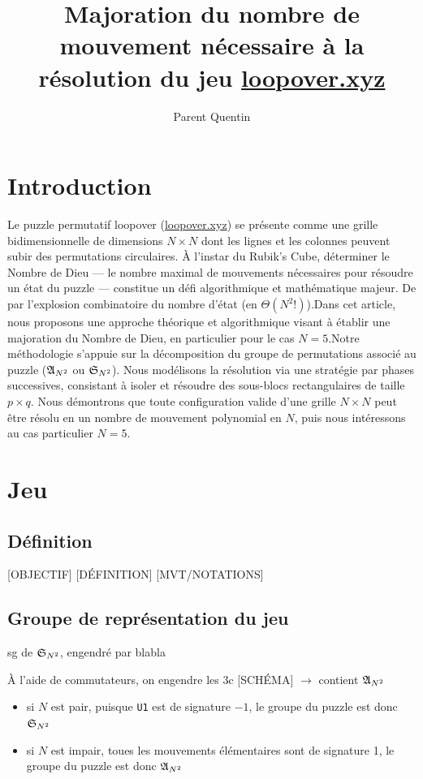 \documentclass[a4paper, 12pt]{article}
\title{Majoration du nombre de mouvement nécessaire à la résolution du jeu \url{loopover.xyz}}
\author{Parent Quentin}
\date{}
\begin{document}
	\maketitle
	
	\section*{Introduction}
	Le puzzle permutatif loopover (\url{loopover.xyz}) se présente comme une grille bidimensionnelle de dimensions $N \times N$ dont les lignes et les colonnes peuvent subir des permutations circulaires. À l'instar du Rubik's Cube, déterminer le Nombre de Dieu — le nombre maximal de mouvements nécessaires pour résoudre un état du puzzle — constitue un défi algorithmique et mathématique majeur. De par l'explosion combinatoire du nombre d'état (en $\Theta(N^2!)$).Dans cet article, nous proposons une approche théorique et algorithmique visant à établir une majoration du Nombre de Dieu, en particulier pour le cas $N=5$.Notre méthodologie s'appuie sur la décomposition du groupe de permutations associé au puzzle ($\mathfrak{A}_{N^2}$ ou $\mathfrak{S}_{N^2}$). Nous modélisons la résolution via une stratégie par phases successives, consistant à isoler et résoudre des sous-blocs rectangulaires de taille $p\times q$. Nous démontrons que toute configuration valide d'une grille $N\times N$ peut être résolu en un nombre de mouvement polynomial en $N$, puis nous intéressons au cas particulier $N=5$.
	
	\section{Jeu}
		\subsection{Définition}
			[OBJECTIF]
			[DÉFINITION]
			[MVT/NOTATIONS]
		\subsection{Groupe de représentation du jeu} \label{gr}
			sg de $\mathfrak{S}_{N^2}$, engendré par blabla
			
			À l'aide de commutateurs, on engendre les 3c [SCHÉMA] $\rightarrow$ contient $\mathfrak{A}_{N^2}$
			
			\begin{itemize}
				\item si $N$ est pair, puisque \texttt{U1} est de signature $-1$, le groupe du puzzle est donc $\mathfrak{S}_{N^2}$
				\item si $N$ est impair, toues les mouvements élémentaires sont de signature 1, le groupe du puzzle est donc $\mathfrak{A}_{N^2}$
			\end{itemize}
	
\end{document}

